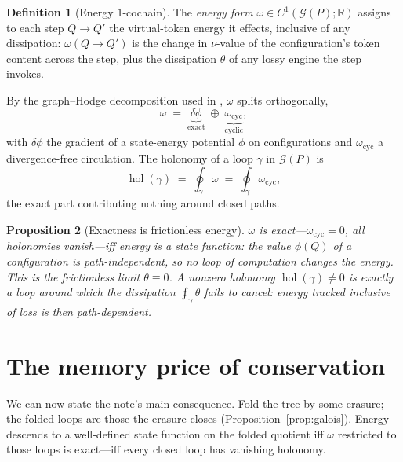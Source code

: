 \documentclass[11pt]{article}
\theoremstyle{definition}
\newtheorem{definition}{Definition}[section]
\theoremstyle{plain}
\newtheorem{proposition}[definition]{Proposition}
\theoremstyle{remark}
\newcommand{\Real}{\mathbb{R}}
\newcommand{\Grph}{\mathcal{G}}
\DeclareMathOperator{\hol}{hol}
\begin{document}
\begin{definition}[Energy $1$-cochain]\label{def:omega}
The \emph{energy form} $\omega\in C^1(\Grph(P);\Real)$ assigns to each step $Q\to Q'$ the
virtual-token energy it effects, inclusive of any dissipation: $\omega(Q\to Q')$ is the change in
$\nu$-value of the configuration's token content across the step, plus the dissipation $\theta$ of
any lossy engine the step invokes.
\end{definition}

By the graph--Hodge decomposition \cite{Hodge} used in \cite[\S4]{VT}, $\omega$ splits orthogonally,
\[
  \omega \;=\; \underbrace{\delta\phi}_{\text{exact}} \;\oplus\; \underbrace{\omega_{\mathrm{cyc}}}_{\text{cyclic}},
\]
with $\delta\phi$ the gradient of a state-energy potential $\phi$ on configurations and
$\omega_{\mathrm{cyc}}$ a divergence-free circulation. The holonomy of a loop $\gamma$ in
$\Grph(P)$ is
\[
  \hol(\gamma)\;=\;\oint_{\gamma}\omega\;=\;\oint_{\gamma}\omega_{\mathrm{cyc}},
\]
the exact part contributing nothing around closed paths.

\begin{proposition}[Exactness is frictionless energy]\label{prop:exact}
$\omega$ is exact---$\omega_{\mathrm{cyc}}=0$, all holonomies vanish---iff energy is a state
function: the value $\phi(Q)$ of a configuration is path-independent, so no loop of computation
changes the energy. This is the frictionless limit $\theta\equiv 0$. A nonzero holonomy
$\hol(\gamma)\neq 0$ is exactly a loop around which the dissipation $\oint_\gamma\theta$ fails to
cancel: energy tracked inclusive of loss is then path-dependent.
\end{proposition}

\section{The memory price of conservation}
\label{sec:price}

We can now state the note's main consequence. Fold the tree by some erasure; the folded loops are
those the erasure closes (Proposition~\ref{prop:galois}). Energy descends to a well-defined state
function on the folded quotient iff $\omega$ restricted to those loops is exact---iff every closed
loop has vanishing holonomy.
\end{document}
